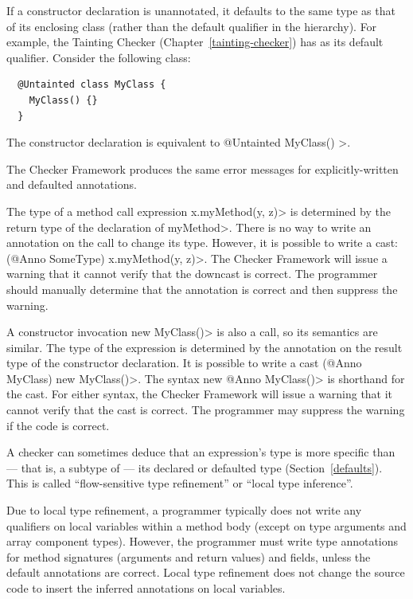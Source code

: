 
If a constructor declaration is unannotated, it defaults to the same type as that of
its enclosing class (rather than the default qualifier in the hierarchy).
For example, the Tainting Checker (Chapter~\ref{tainting-checker}) has 
as its default qualifier. Consider the following class:

\begin{Verbatim}
  @Untainted class MyClass {
    MyClass() {}
  }
\end{Verbatim}

\noindent
The constructor declaration is equivalent to \<@Untainted MyClass() \ttlcb\ttrcb>.

The Checker Framework produces the same error messages for
explicitly-written and defaulted annotations.



The type of a method call expression \<x.myMethod(y, z)> is determined by
the return type of the declaration of \<myMethod>.  There is no way to
write an annotation on the call to change its type.  However, it is
possible to write a cast:  \<(@Anno SomeType) x.myMethod(y, z)>.  The Checker
Framework will issue a warning that it cannot verify that the downcast is
correct.  The programmer should manually determine that the annotation is
correct and then suppress the warning.

A constructor invocation \<new MyClass()> is also a call, so its semantics
are similar.  The type of the expression is determined by the annotation on
the result type of the constructor declaration.  It is possible to write a cast
\<(@Anno MyClass) new MyClass()>.  The syntax \<new @Anno MyClass()> is shorthand
for the cast.  For either syntax, the Checker Framework will issue a
warning that it cannot verify that the cast is correct.  The programmer may
suppress the warning if the code is correct.



A checker can sometimes deduce that an expression's type is more specific
than --- that is, a subtype of --- its declared or defaulted type (Section~\ref{defaults}).
This is called ``flow-sensitive type refinement'' or ``local type inference''.

Due to local type refinement, a programmer typically
does not write any qualifiers on local variables within a method body
(except on type arguments and array component types).
However, the programmer must write type annotations for method
signatures (arguments and return values) and fields, unless the default
annotations are correct.
Local type refinement does not change the source code to insert the
inferred annotations on local variables.


